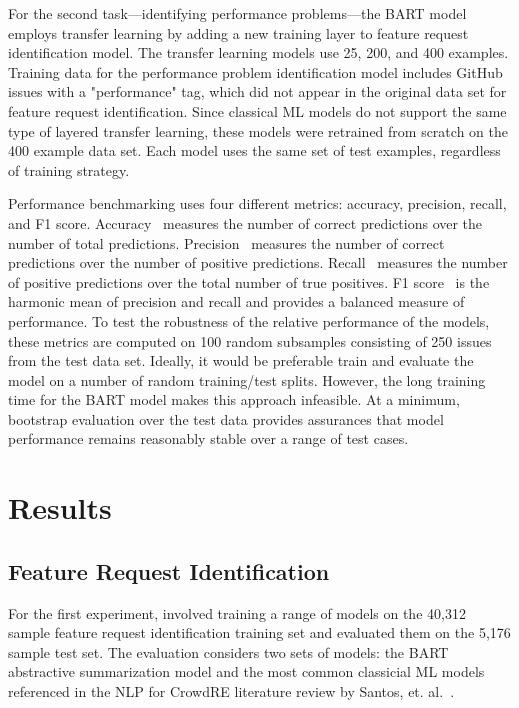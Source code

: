 For the second task---identifying performance problems---the BART model employs transfer learning by adding a new training layer to feature request identification model. The transfer learning models use 25, 200, and 400 examples. Training data for the performance problem identification model includes GitHub issues with a "performance" tag, which did not appear in the original data set for feature request identification. Since classical ML models do not support the same type of layered transfer learning, these models were retrained from scratch on the 400 example data set. Each model uses the same set of test examples, regardless of training strategy.

Performance benchmarking uses four different metrics: accuracy, precision, recall, and F1 score. Accuracy~\cite{friedman} measures the number of correct predictions over the number of total predictions. Precision~\cite{friedman} measures the number of correct predictions over the number of positive predictions. Recall~\cite{friedman} measures the number of positive predictions over the total number of true positives. F1 score~\cite{friedman} is the harmonic mean of precision and recall and provides a balanced measure of performance. To test the robustness of the relative performance of the models, these metrics are computed on 100 random subsamples consisting of 250 issues from the test data set. Ideally, it would be preferable train and evaluate the model on a number of random training/test splits. However, the long training time for the BART model makes this approach infeasible. At a minimum, bootstrap evaluation over the test data provides assurances that model performance remains reasonably stable over a range of test cases.

\section{Results}

\subsection{Feature Request Identification}

For the first experiment, involved training a range of models on the 40,312 sample feature request identification training set and evaluated them on the 5,176 sample test set. The evaluation considers two sets of models: the BART abstractive summarization model and the most common classicial ML models referenced in the NLP for CrowdRE literature review by Santos, et. al.~\cite{santos}. 

